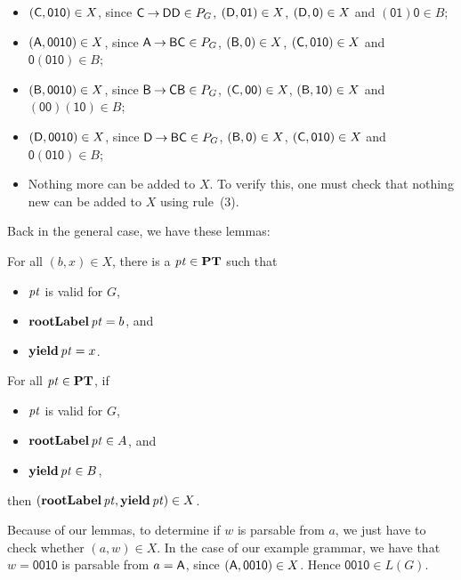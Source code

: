 \begin{itemize}
\item $(\mathsf{C},\mathsf{010})\in X$, since $\mathsf{C}\mathbin{\to}\mathsf{DD}\in P_G$,
$(\mathsf{D},\mathsf{01})\in X$, $(\mathsf{D},\mathsf{0})\in X$ and
$\mathsf{(01)0}\in B$;

\item $(\mathsf{A},\mathsf{0010})\in X$, since $\mathsf{A}\mathbin{\to}\mathsf{BC}\in P_G$,
$(\mathsf{B},\mathsf{0})\in X$, $(\mathsf{C},\mathsf{010})\in X$ and
$\mathsf{0(010)}\in B$;

\item $(\mathsf{B},\mathsf{0010})\in X$, since $\mathsf{B}\mathbin{\to}\mathsf{CB}\in P_G$,
$(\mathsf{C},\mathsf{00})\in X$, $(\mathsf{B},\mathsf{10})\in X$ and
$\mathsf{(00)(10)}\in B$;

\item $(\mathsf{D},\mathsf{0010})\in X$, since $\mathsf{D}\mathbin{\to}\mathsf{BC}\in P_G$,
$(\mathsf{B},\mathsf{0})\in X$, $(\mathsf{C},\mathsf{010})\in X$ and
$\mathsf{0(010)}\in B$;

\item Nothing more can be added to $X$.  To verify this, one must
check that nothing new can be added to $X$ using rule~(3).
\end{itemize}

Back in the general case, we have these lemmas:

\begin{lemma}
For all $(b,x)\in X$, there is a ${\it pt}\in\mathbf{PT}$ such that
\begin{itemize}
\item ${\it pt}$ is valid for $G$,

\item $\mathbf{rootLabel}\,{\it pt}=b$, and

\item $\mathbf{yield}\,{\it pt}=x$.
\end{itemize}
\end{lemma}

\begin{lemma}
For all ${\it pt}\in\mathbf{PT}$, if
\begin{itemize}
\item ${\it pt}$ is valid for $G$,

\item $\mathbf{rootLabel}\,{\it pt}\in A$, and

\item $\mathbf{yield}\,{\it pt}\in B$,
\end{itemize}
then $(\mathbf{rootLabel}\,{\it pt}, \mathbf{yield}\,{\it pt})\in X$.
\end{lemma}

Because of our lemmas, to determine if $w$ is parsable from $a$, we
just have to check whether $(a, w)\in X$.
In the case of our example grammar, we have that $w=\mathsf{0010}$ is
parsable from $a=\mathsf{A}$, since $(\mathsf{A},\mathsf{0010})\in X$.
Hence $\mathsf{0010}\in L(G)$.

